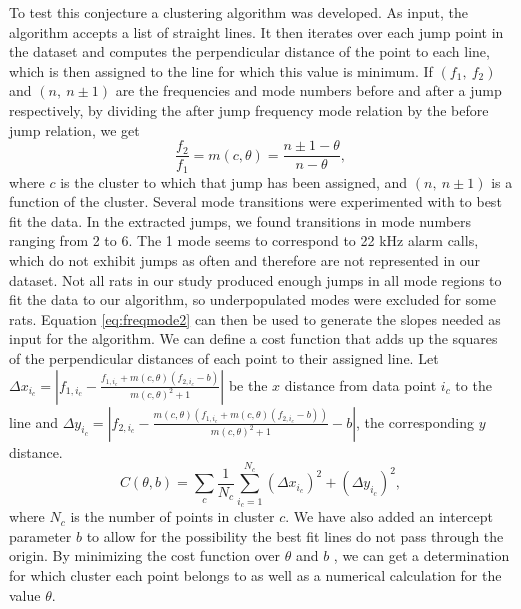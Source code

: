 \documentclass[twocolumn, prX]{revtex4}
\begin{document}
To test this conjecture a clustering algorithm was developed. As input, the algorithm accepts a list of straight lines. It then iterates over each jump point in the dataset and computes the perpendicular distance of the point to each line, which is then assigned to the line for which this value is minimum. If $\left(f_{1},\: f_{2}\right)$ and $\left(n,\: n\pm1\right)$ are the frequencies and mode numbers before and after a jump respectively, by dividing the after jump frequency mode relation by the before jump relation, we get \begin{equation}
\frac{f_{2}}{f_{1}}=m(c,\theta)=\frac{n\pm1-\theta}{n-\theta},\label{eq:freqmode2}
\end{equation}
where $c$ is the cluster to which that jump has been assigned, and $\left(n,\: n\pm1\right)$ is a function of the cluster. Several mode transitions were experimented with to best fit the data. In the extracted jumps, we found transitions in mode numbers ranging from 2 to 6. The 1 mode seems to correspond to 22 kHz alarm calls, which do not exhibit jumps as often and therefore are not represented in our dataset. Not all rats in our study produced enough jumps in all mode regions to fit the data to our algorithm, so underpopulated modes were excluded for some rats. Equation \ref{eq:freqmode2} can then be used to generate the slopes needed as input for the algorithm. We can define a cost function that adds up the squares of the perpendicular distances of each point to their assigned line. Let $\Delta x_{i_{c}}=\left\vert f_{1,i_{c}}-\frac{f_{1,i_{c}}+m\left(c,\theta\right)\left(f_{2,i_{c}}-b\right)}{m\left(c,\theta\right)^{2}+1}\right\vert $ be the $x$ distance from data point $i_c$ to the line and $\Delta y_{i_c}=\left\vert f_{2,i_{c}}-\frac{m\left(c,\theta\right)\left(f_{1,i_{c}}+m\left(c,\theta\right)\left(f_{2,i_{c}}-b\right)\right)}{m\left(c,\theta\right)^{2}+1} - b \right\vert$, the corresponding $y$ distance. 
\begin{equation}
C\left(\theta, b\right)=\sum_{c}\frac{1}{N_{c}}\sum_{i_c=1}^{N_{c}}\left(\Delta x_{i_c}\right)^{2}+\left(\Delta y_{i_c}\right)^{2},\label{eq:cost}
\end{equation}
where $N_{c}$ is the number of points in cluster $c$. We have also added an intercept parameter $b$ to allow for the possibility the best fit lines do not pass through the origin. By minimizing the cost function over $\theta$ and $b$ , we can get a determination for which cluster each point belongs to as well as a numerical calculation for the value $\theta$.
\end{document}

